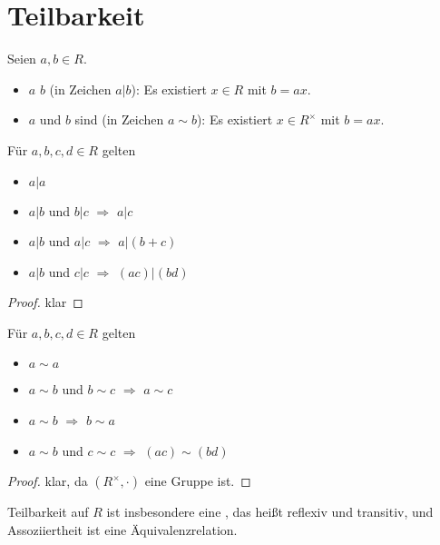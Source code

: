 \section{Teilbarkeit}

\begin{definition}[Teilbarkeit]
	Seien $a,b\in R$.
	\begin{itemize}
		\item $a$  $b$ (in Zeichen $a\vert b$): Es existiert $x\in R$ mit $b=ax$.
		\item $a$ und $b$ sind  (in Zeichen $a\sim b$): Es existiert $x\in R^{\times}$ mit $b=ax$.
	\end{itemize}
\end{definition}

\begin{lemma}
	Für $a,b,c,d\in R$ gelten
	\begin{itemize}
		\item $a\vert a$
		\item $a\vert b$ und $b\vert c$ $\Rightarrow$ $a\vert c$
		\item $a\vert b$ und $a\vert c$ $\Rightarrow$ $a\vert (b+c)$
		\item $a\vert b$ und $c\vert c$ $\Rightarrow$ $(ac)\vert (bd)$
	\end{itemize}
\end{lemma}
\begin{proof}
	klar
\end{proof}

\begin{lemma}
	Für $a,b,c,d\in R$ gelten
	\begin{itemize}
		\item $a\sim a$
		\item $a\sim b$ und $b\sim c$ $\Rightarrow$ $a\sim c$
		\item $a\sim b$ $\Rightarrow$ $b\sim a$
		\item $a\sim b$ und $c\sim c$ $\Rightarrow$ $(ac)\sim (bd)$
	\end{itemize}
\end{lemma}
\begin{proof}
	klar, da $(R^\times,\cdot)$ eine Gruppe ist.
\end{proof}

\begin{remark}
	Teilbarkeit auf $R$ ist insbesondere eine , das heißt reflexiv und transitiv, und Assoziiertheit ist eine Äquivalenzrelation.
\end{remark}

